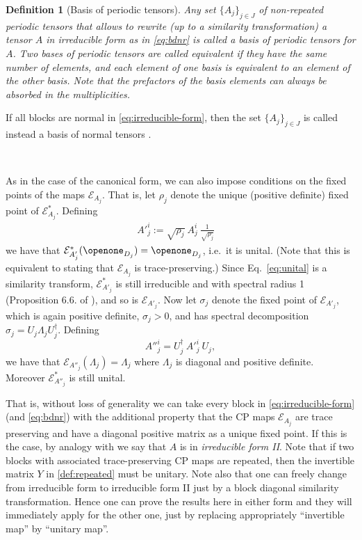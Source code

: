 \documentclass[pra,a4paper,notitlepage,nofootinbib,superscriptaddress]{revtex4-1}
\theoremstyle{plain}
\newtheorem{definition}[lemma]{Definition}
\newcommand{\E}{\mathcal{E}}
\newcommand{\1}{{\openone}}
\newcommand{\be}{\begin{eqnarray}}
\newcommand{\ee}{\end{eqnarray}}
\begin{document}
\begin{definition}[Basis of periodic tensors]
    Any set $\{A_j\}_{j\in J}$ of non-repeated periodic tensors that allows to rewrite (up to a similarity transformation) a tensor $A$ in irreducible form as in \eqref{eq:bdnr} is called a \emph{basis of periodic tensors for $A$}.
    Two bases of periodic tensors are called \emph{equivalent} if they have the same number of elements, and each element of one basis is equivalent to an element of the other basis. Note that the prefactors of the basis elements can always be absorbed in the multiplicities.
\end{definition}


If all blocks are normal in \eqref{eq:irreducible-form}, then the set $\{A_j\}_{j\in J}$ is called  instead a basis of normal tensors \cite{Ci15}.


\

As in the case of the canonical form, we can also impose conditions on the fixed points of the maps $\E_{A_j}$. That is,  let  $\rho_j$ denote the unique (positive definite) fixed point of  $\E^*_{A_j}$.
Defining
\be
    A'^i_j := \sqrt{\rho_j} \: A^i_j \: \frac{1}{\sqrt{\rho_j}}\quad   \label{eq:unital}
\ee
we have that $\E^*_{A'_j}(\openone_{D_j})=\openone_{D_j}$, i.e.\ it is unital.
(Note that this is equivalent to stating that $\E_{A_j}$ is trace-preserving.)
Since Eq.\ \eqref{eq:unital} is a similarity transform, $\E^*_{A'_j}$ is still irreducible and with spectral radius 1
(Proposition 6.6. of \cite{Wo11}), and so is $\E_{A'_j}$.
Now let $\sigma_j$ denote the fixed point of $\E_{A'_j}$, which is again
positive definite, $\sigma_j>0$, and has spectral decomposition $\sigma_j = U_j \Lambda_j U_j^\dagger$.
Defining
$$
    A''^i_j = U_j^\dagger \: A'^i_j \:U_j ,
$$
we have that $\E_{A''_j}(\Lambda_j) = \Lambda_j$ where $\Lambda_j$ is diagonal and positive definite.
Moreover $\E^*_{A''_j}$ is still unital.

That is, without loss of generality we can take every block in \eqref{eq:irreducible-form} (and \eqref{eq:bdnr}) with the additional property that the CP maps $\E_{A_j}$ are trace preserving and have a diagonal positive matrix as a unique fixed point. If this is the case, by analogy with \cite{Ci15} we say that $A$ is in \emph{irreducible form II}.
Note that if two blocks with associated trace-preserving CP maps are repeated, then the invertible matrix $Y$ in \cref{def:repeated} must be unitary. Note also that one can freely change from irreducible form to irreducible form II just by a block diagonal similarity transformation. Hence one can prove the results here in either form and they will immediately apply for the other one, just by replacing  appropriately ``invertible map'' by ``unitary map''.
\end{document}
